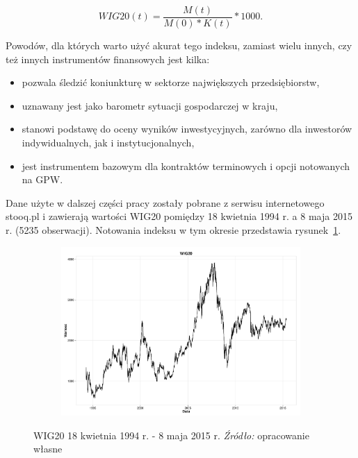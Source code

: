 \documentclass[polish, twoside, 12pt, a4paper]{article}
\theoremstyle{definition}
\theoremstyle{plain}
\theoremstyle{remark}
\begin{document}
\begin{equation}\label{6}
WIG20(t)=\frac{M(t)}{M(0)*K(t)}*1000.
\end{equation}

Powodów, dla których warto użyć akurat tego indeksu, zamiast wielu innych, czy też innych instrumentów finansowych jest kilka:
\begin{itemize}
	\item pozwala śledzić koniunkturę w sektorze największych przedsiębiorstw,
	\item uznawany jest jako barometr sytuacji gospodarczej w kraju,
	\item stanowi podstawę do oceny wyników inwestycyjnych, zarówno dla inwestorów indywidualnych, jak i instytucjonalnych,
	\item jest instrumentem bazowym dla kontraktów terminowych i opcji notowanych na GPW.
\end{itemize}

Dane użyte w dalszej części pracy zostały pobrane z serwisu internetowego stooq.pl i zawierają wartości WIG20 pomiędzy 18 kwietnia 1994 r. a 8 maja 2015 r. (5235 obserwacji). Notowania indeksu w tym okresie przedstawia rysunek~\ref{rys001}.

\begin{figure}[H]
  \centering

  \begin{subfigure}[t]{1.00\textwidth}
    \includegraphics[width=\textwidth]{./rys001}
  \end{subfigure}

  \captionsetup{margin=10pt,font=small,labelfont=bf,width=.8\textwidth}

  \caption[WIG20 18.04.94 r. - 08.05.15 r.]{WIG20 18 kwietnia 1994 r. - 8 maja 2015 r. \textit{Źródło:} opracowanie własne}\label{rys001}
\end{figure}
\end{document}
